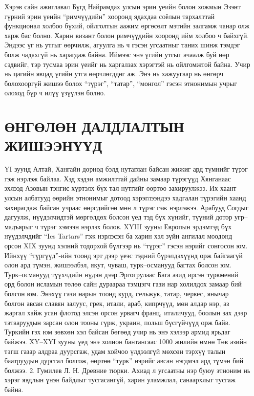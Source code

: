 Хэрэв сайн ажиглавал Бүгд Найрамдах улсын эрин үеийн болон хожмын Эзэнт гүрний эрин үеийн “римчүүдийн” хооронд ядахдаа соёлын тархалттай функционал холбоо бүхий, ойлголтын аажим өргөсөлт мэтийн залгамж чанар олж харж бас болно. Харин визант болон римчүүдийн хооронд ийм холбоо ч байхгүй. Эндээс үг нь утгыг өөрчилж, агуулга нь ч гэсэн угсаатныг таних шинж тэмдэг болж чадахгүй нь харагдаж байна. Иймээс энэ үгийн утгыг ачаалж буй өөр сэдвийг, тэр тусмаа эрин үеийг нь харгалзах хэрэгтэй нь ойлгомжтой байна. Учир нь цагийн явцад үгийн утга өөрчлөгддөг аж. Энэ нь хажуугаар нь өнгөрч болохооргүй жишээ болох “түрэг”, “татар”, “монгол” гэсэн этнонимын учрыг олоход бүр ч илүү үзүүлэн болно.
\section{ӨНГӨЛӨН ДАЛДЛАЛТЫН ЖИШЭЭНҮҮД}
YI зуунд Алтай, Хангайн дорнод бэлд нутаглан байсан жижиг ард түмнийг түрэг гэж нэрлэж байлаа. Хэд хэдэн амжилттай дайны замаар түрэгүүд Хянганаас эхлээд Азовын тэнгис хүртэлх бүх тал нутгийг өөртөө захируулжээ. Их хаант улсын албатууд өөрийн этнонимыг дотоод хэрэглээндээ хадгалан түрэгийн хаанд захирагдаж байсан учраас өөрсдийгөө мөн л түрэг гэж нэрлэжээ. Арабууд Согдыг дагуулж, нүүдэлчидтэй мөргөлдөх болсон үед тэд бүх хүнийг, түүний дотор угр–мадъярыг ч түрэг хэмээн нэрлэх болов. XYIII зууны Европын эрдэмтэд бүх нүүдэлчдийг “Ies Tartars” гэж нэрлэсэн ба харин хэл зүйн ангилал моодонд орсон XIX зуунд хэлний тодорхой бүлгээр нь “түрэг” гэсэн нэрийг сонгосон юм. Ийнхүү “түргүүд”-ийн тоонд эрт дээр үеэс тэдний бүрэлдэхүүнд орж байгаагүй олон ард түмэн, жишээлбэл, якут, чуваш, турк–османууд багтах болсон юм.
Турк–османууд түүхчдийн нүдэн дээр Эргогрулаас Бага азид ирсэн туркмений орд болон исламын төлөө сайн дураараа тэмцэгч гази нар холилдох замаар бий болсон юм. Энэхүү гази нарын тоонд курд, сельжук, татар, черкес, янычар болгон авсан славян залуус, грек, итали, араб, кипрчүүд, мөн алдар нэр, аз жаргал хайж усан флотод элсэн орсон урвагч франц, италичууд, боолын зах дээр татааруудын зарсан олон тооны гүрж, украин, польш бүсгүйчүүд орж байв. Туркийн гэх юм зөвхөн хэл байсан бөгөөд учир нь энэ хэлээр армид ярьдаг байжээ. XY–XYI зууны үед энэ холион бантангаас 1000 жилийн өмнө Төв азийн тэгш газар алдраа дуурсгаж, удам хойчоо үлдээлгүй мөхсөн тэрхүү талын баатруудын дурсгал болгож, өөртөө “турк” нэрийг авсан нэгдмэл ард түмэн бий болжээ. 2. Гумилев Л. Н. Древние тюрки.
Ахиад л угсаатны нэр буюу этноним нь хэрэг явдлын үнэн байдлыг тусгасангүй, харин уламжлал, санаархлыг тусгаж байна.
